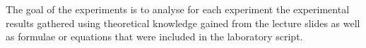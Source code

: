 The goal of the experiments is to analyse for each experiment the experimental results gathered using theoretical knowledge gained from the lecture slides as well as formulae or equations that were included in the laboratory script. 